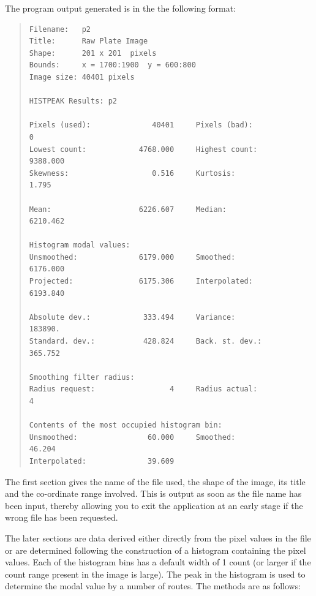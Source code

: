 \documentclass[twoside,11pt]{article}
\newenvironment{myquote}{\begin{quote}\begin{small}}{\end{small}\end{quote}}
\begin{document}
The program output generated is in the the following format:

\begin{myquote}
\begin{verbatim}
Filename:   p2
Title:      Raw Plate Image
Shape:      201 x 201  pixels
Bounds:     x = 1700:1900  y = 600:800
Image size: 40401 pixels

HISTPEAK Results: p2

Pixels (used):              40401     Pixels (bad):                0
Lowest count:            4768.000     Highest count:        9388.000
Skewness:                   0.516     Kurtosis:                1.795

Mean:                    6226.607     Median:               6210.462

Histogram modal values:
Unsmoothed:              6179.000     Smoothed:             6176.000
Projected:               6175.306     Interpolated:         6193.840

Absolute dev.:            333.494     Variance:              183890.
Standard. dev.:           428.824     Back. st. dev.:        365.752

Smoothing filter radius:
Radius request:                 4     Radius actual:               4

Contents of the most occupied histogram bin:
Unsmoothed:                60.000     Smoothed:               46.204
Interpolated:              39.609
\end{verbatim}
\end{myquote}

The first section gives the name of the file used, the shape of the image,
its title and the co-ordinate range involved. This is output as soon as
the file name has been input, thereby allowing you to exit the application
at an early stage if the wrong file has been requested.

The later sections are data derived either directly from the pixel values
in the file or are determined following the construction of a histogram
containing the pixel values. Each of the histogram bins has a default 
width of 1 count (or larger if the count range present in the image is large).
The peak in the histogram is used to determine the modal
value by a number of routes. The methods are as follows:
\end{document}
